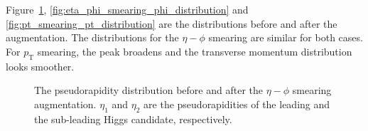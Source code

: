 \documentclass[12pt]{article}
\begin{document}
        Figure~\ref{fig:eta_phi_smearing_eta_distribution}, \ref{fig:eta_phi_smearing_phi_distribution} and \ref{fig:pt_smearing_pt_distribution} are the distributions before and after the augmentation. The distributions for the $\eta-\phi$ smearing are similar for both cases. For $p_\text{T}$ smearing, the peak broadens and the transverse momentum distribution looks smoother.
        \begin{figure}[htpb]
            \centering
            \caption{The pseudorapidity distribution before and after the $\eta-\phi$ smearing augmentation. $\eta_1$ and $\eta_2$ are the pseudorapidities of the leading and the sub-leading Higgs candidate, respectively.}
            \label{fig:eta_phi_smearing_eta_distribution}
        \end{figure}
\end{document}
